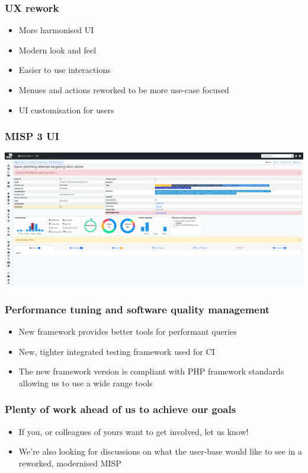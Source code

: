 \begin{frame}
  \frametitle{UX rework}
  \begin{itemize}
     \item More harmonised UI
     \item Modern look and feel
     \item Easier to use interactions
     \item Menues and actions reworked to be more use-case focused
     \item UI customisation for users
  \end{itemize}
\end{frame}

\begin{frame}
\frametitle{MISP 3 UI}
\begin{center}
\includegraphics[scale=0.18]{images/misp3.png}
\end{center}
\end{frame}

\begin{frame}
  \frametitle{Performance tuning and software quality management}
  \begin{itemize}
     \item New framework provides better tools for performant queries
     \item New, tighter integrated testing framework used for CI
     \item The new framework version is compliant with PHP framework standards allowing us to use a wide range tools
  \end{itemize}
\end{frame}

\begin{frame}
  \frametitle{Plenty of work ahead of us to achieve our goals}
  \begin{itemize}
     \item If you, or colleagues of yours want to get involved, let us know!
     \item We're also looking for discussions on what the user-base would like to see in a reworked, modernised MISP
  \end{itemize}
\end{frame}

